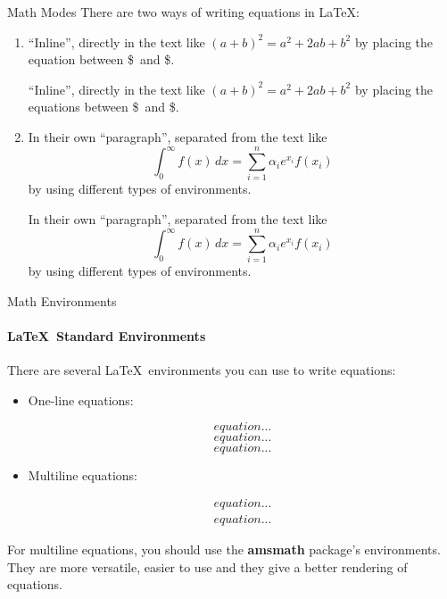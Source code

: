 \begin{frame}[fragile]{Math Modes}
	There are two ways of writing equations in \LaTeX:
	
	\begin{enumerate}
		\item ``Inline'', directly in the text like $(a + b)^2 = a^2 + 2ab + b^2$ by placing the equation between \$\ and \$.
\begin{codesource}
	``Inline'', directly in the text like $(a + b)^2 = a^2 + 2ab + b^2$ by placing 
	the equations between \$\ and \$.
\end{codesource}
		\item In their own ``paragraph'', separated from the text like
			\begin{equation*}
				\int_0^\infty f(x)\, dx =
				\sum_{i = 1}^n \alpha_i e^{x_i} f(x_i)
			\end{equation*}
			by using different types of environments.
\begin{codesource}
	In their own ``paragraph'', separated from the text like
	\begin{equation*}
		\int_0^\infty f(x)\, dx =
		\sum_{i = 1}^n \alpha_i e^{x_i} f(x_i)
	\end{equation*}
	by using different types of environments.
\end{codesource}
	\end{enumerate}
\end{frame}


\begin{frame}[fragile,c]{Math Environments}
	\framesubtitle{\LaTeX\ Standard Environments}
	There are several \LaTeX\ environments you can use to write equations:
	\begin{itemize}
		\item One-line equations:
\begin{codesource}
	\begin{displaymath} equation...	\end{displaymath}
	\begin{equation} equation... \end{equation}
	\begin{equation*} equation... \end{equation*}
\end{codesource}
		\item Multiline equations:
\begin{codesource}
	\begin{eqnarray} equation...  \end{eqnarray}
	\begin{eqnarray*} equation... \end{eqnarray*}
\end{codesource}
	\end{itemize}

	\pause
	For multiline equations, you should use the \textbf{amsmath} package's environments. They are more versatile, easier to use and they give a better rendering of equations.
\end{frame}

